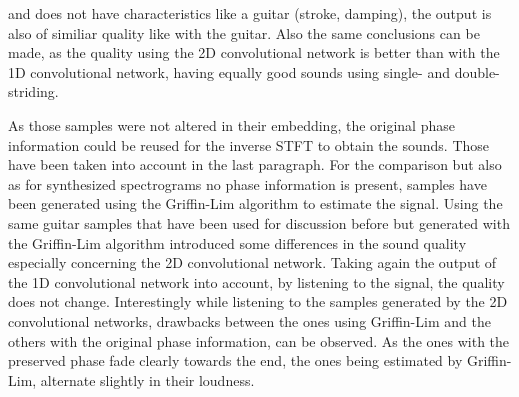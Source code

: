 and does not have characteristics like a guitar (stroke, damping), the output is also of similiar quality like with the guitar. Also the same conclusions can be made, as the quality using the 2D convolutional network is better than with the 1D convolutional network, having equally good sounds using single- and double-striding. 

As those samples were not altered in their embedding, the original phase information could be reused for the inverse STFT to obtain the sounds. Those have been taken into account in the last paragraph. For the comparison but also as for synthesized spectrograms no phase information is present, samples have been generated using the Griffin-Lim algorithm \cite{Griffin1984} to estimate the signal. Using the same guitar samples that have been used for discussion before but generated with the Griffin-Lim algorithm introduced some differences in the sound quality especially concerning the 2D convolutional network. Taking again the output of the 1D convolutional network into account, by listening to the signal, the quality does not change. Interestingly while listening to the samples generated by the 2D convolutional networks, drawbacks between the ones using Griffin-Lim and the others with the original phase information, can be observed. As the ones with the preserved phase fade clearly towards the end, the ones being estimated by Griffin-Lim, alternate slightly in their loudness.

